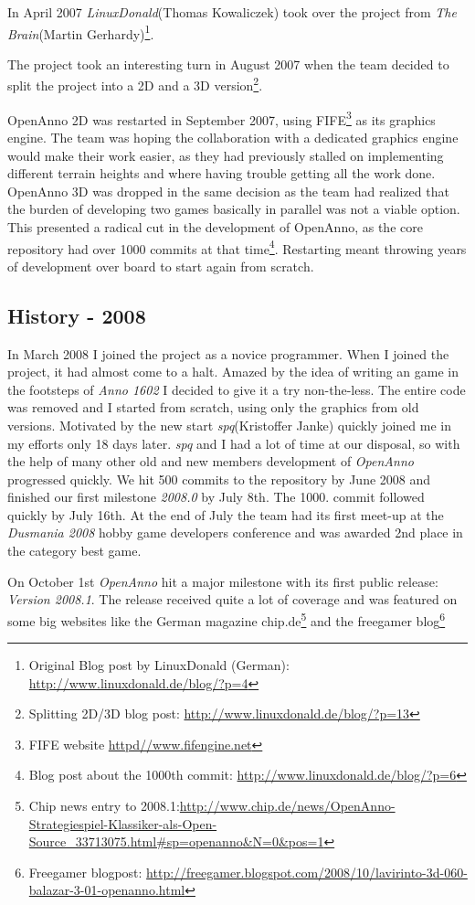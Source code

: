 In April 2007 \textit{LinuxDonald}(Thomas Kowaliczek) took over the project from
\textit{The Brain}(Martin Gerhardy)\footnote{Original Blog post by LinuxDonald (German):
\url{http://www.linuxdonald.de/blog/?p=4}}.

The project took an interesting turn in August 2007 when the team decided to
split the project into a 2D and a 3D version\footnote{Splitting 2D/3D blog post:
\url{http://www.linuxdonald.de/blog/?p=13}}.

OpenAnno 2D was restarted in September 2007, using FIFE\footnote{FIFE
website \url{httpd//www.fifengine.net}} as its graphics engine. The team was hoping the collaboration with a dedicated
graphics engine would make their work easier, as they had previously stalled on implementing different terrain heights
and where having trouble getting all the work done. OpenAnno 3D was dropped in the same decision as the team had
realized that the burden of developing two games basically in parallel was not a viable option. This presented a radical
cut in the development of OpenAnno, as the core repository had over 1000 commits at that time\footnote{Blog post about
the 1000th commit: \url{http://www.linuxdonald.de/blog/?p=6}}. Restarting meant throwing years of development over board
to start again from scratch.

\subsection{History - 2008}
In March 2008 I joined the project as a novice programmer. When I joined the project, it had almost come to a halt. Amazed
by the idea of writing an \OS{} game in the footsteps of \textit{Anno 1602} I decided to give it a try non-the-less. The
entire code was removed and I started from scratch, using only the graphics from old versions. Motivated by the new start
\textit{spq}(Kristoffer Janke) quickly joined me in my efforts only 18 days later. \textit{spq} and I had a lot of time at our disposal, so with
the help of many other old and new members development of \textit{OpenAnno} progressed quickly. We hit 500 commits to the repository
by June 2008 and finished our first milestone \textit{2008.0} by July 8th. The 1000. commit followed quickly by July 16th. At the
end of July the team had its first meet-up at the \textit{Dusmania 2008} hobby game developers conference and was awarded
2nd place in the category best game.

On October 1st \textit{OpenAnno} hit a major milestone with its first public release: \textit{Version 2008.1}. The release
received quite a lot of coverage and was featured on some big websites like the German magazine chip.de\footnote{Chip news entry to
2008.1:\url{http://www.chip.de/news/OpenAnno-Strategiespiel-Klassiker-als-Open-Source_33713075.html\#sp=openanno&N=0&pos=1}}
and the freegamer blog\footnote{Freegamer blogpost: \url{http://freegamer.blogspot.com/2008/10/lavirinto-3d-060-balazar-3-01-openanno.html}}

